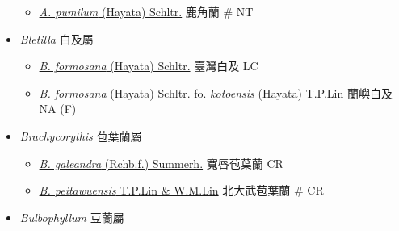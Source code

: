 \begin{itemize}
  \begin{itemize}
        \item[] \href{http://www.theplantlist.org/tpl1.1/search?q=Ascocentrum+pumilum}{\textit{A. pumilum} (Hayata) Schltr.}   鹿角蘭  \# NT
  \end{itemize}
 \item[] \textit{Bletilla} 白及屬
                                
  \begin{itemize}
        \item[] \href{http://www.theplantlist.org/tpl1.1/search?q=Bletilla+formosana}{\textit{B. formosana} (Hayata) Schltr.}   臺灣白及   LC
        \item[] \href{http://www.theplantlist.org/tpl1.1/search?q=Bletilla+formosana+fo.+kotoensis}{\textit{B. formosana} (Hayata) Schltr. fo. \textit{kotoensis} (Hayata) T.P.Lin}   蘭嶼白及   NA (F)
  \end{itemize}
 \item[] \textit{Brachycorythis} 苞葉蘭屬
                                
  \begin{itemize}
        \item[] \href{http://www.theplantlist.org/tpl1.1/search?q=Brachycorythis+galeandra}{\textit{B. galeandra} (Rchb.f.) Summerh.}   寬唇苞葉蘭   CR
        \item[] \href{http://www.theplantlist.org/tpl1.1/search?q=Brachycorythis+peitawuensis}{\textit{B. peitawuensis} T.P.Lin \& W.M.Lin}   北大武苞葉蘭  \# CR
  \end{itemize}
 \item[] \textit{Bulbophyllum} 豆蘭屬
                                

\end{itemize}
